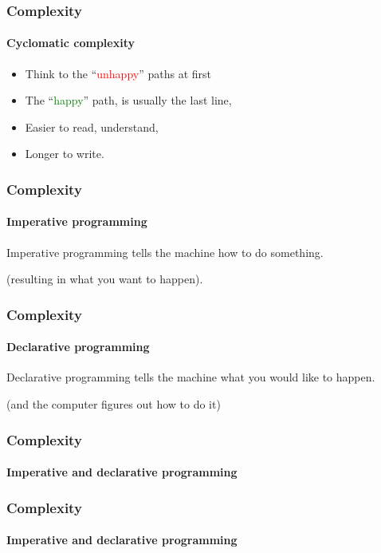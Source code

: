 \begin{frame}
    \frametitle{Complexity}
    \framesubtitle{Cyclomatic complexity}

    \begin{itemize}[<+->]
        \item Think to the ``\textcolor{red}{unhappy}'' paths at first
        \item The ``\textcolor{green}{happy}'' path, is usually the last line,
        \item Easier to read, understand,
        \item Longer to write.
    \end{itemize}
\end{frame}

\begin{frame}
    \frametitle{Complexity}
    \framesubtitle{Imperative programming}

    Imperative programming tells the machine how to do something.

    \pause

    (resulting in what you want to happen).
\end{frame}

\begin{frame}
    \frametitle{Complexity}
    \framesubtitle{Declarative programming}

    Declarative programming tells the machine what you would like to happen.

    \pause

    (and the computer figures out how to do it)
\end{frame}

\begin{frame}
    \frametitle{Complexity}
    \framesubtitle{Imperative and declarative programming}


\pause

\end{frame}

\begin{frame}
    \frametitle{Complexity}
    \framesubtitle{Imperative and declarative programming}


\pause

\end{frame}


